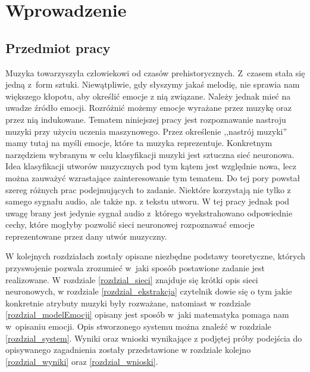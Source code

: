 \section{Wprowadzenie}
\subsection{Przedmiot pracy}
Muzyka towarzyszyła człowiekowi od czasów prehistorycznych. Z~czasem stała się jedną z~form sztuki. Niewątpliwie, gdy słyszymy jakaś melodię, nie sprawia nam większego kłopotu, aby określić emocje z nią związane. Należy jednak mieć na uwadze źródło emocji. Rozróżnić możemy emocje wyrażane przez muzykę oraz przez nią indukowane. Tematem niniejszej pracy jest rozpoznawanie nastroju muzyki przy użyciu uczenia maszynowego. Przez określenie ,,nastrój muzyki'' mamy tutaj na myśli emocje, które ta muzyka reprezentuje. 
Konkretnym narzędziem wybranym w celu klasyfikacji muzyki jest sztuczna sieć neuronowa. Idea klasyfikacji utworów muzycznych pod tym kątem jest względnie nowa, lecz można zauważyć wzrastające zainteresowanie tym tematem\cite{stateOfArt}. Do tej pory powstał szereg różnych prac podejmujących to zadanie\cite{musicANN1}\cite{musicANN2}\cite{musicANN3}. Niektóre korzystają nie tylko z samego sygnału audio, ale także np. z tekstu utworu\cite{musicLyrics}. W tej pracy jednak pod uwagę brany jest jedynie sygnał audio z~którego wyekstrahowano odpowiednie cechy, które mogłyby pozwolić sieci neuronowej rozpoznawać emocje reprezentowane przez dany utwór muzyczny. 

W kolejnych rozdziałach zostały opisane niezbędne podstawy teoretyczne, których przyswojenie pozwala zrozumieć w~jaki sposób postawione zadanie jest realizowane. W rozdziale \ref{rozdzial_sieci} znajduje się krótki opis sieci neuronowych, w rozdziale \ref{rozdzial_ekstrakcja} czytelnik dowie się o tym jakie konkretnie atrybuty muzyki były rozważane, natomiast w rozdziale \ref{rozdzial_modelEmocji} opisany jest sposób w~jaki matematyka pomaga nam w~opisaniu emocji. Opis stworzonego systemu można znaleźć w rozdziale \ref{rozdzial_system}. Wyniki oraz wnioski wynikające z podjętej próby podejścia do opisywanego zagadnienia zostały przedstawione w rozdziale kolejno \ref{rozdzial_wyniki} oraz \ref{rozdzial_wnioski}.
